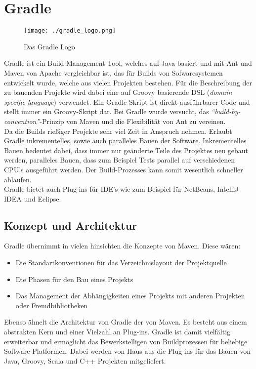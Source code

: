 \documentclass[a4paper]{article}
\begin{document}
\section{Gradle}
\begin{figure}[h]
	\begin{center}
		\texttt{[image: ./gradle\_logo.png]}
		\caption{Das Gradle Logo}
		\label{fig:gradle_logo}
	\end{center}
\end{figure}
Gradle ist ein Build-Management-Tool, welches auf Java basiert und mit Ant und Maven von Apache vergleichbar ist, das für Builds  von Sofwaresystemen entwickelt wurde, welche aus vielen Projekten bestehen. Für die Beschreibung der zu bauenden Projekte wird dabei eine auf Groovy basierende DSL (\textit{domain specific language}) verwendet. Ein Gradle-Skript ist direkt ausführbarer Code und stellt immer ein Groovy-Skript dar. Bei Gradle wurde versucht, das \textit{\textquotedblleft build-by-convention\textquotedblright}-Prinzip von Maven und die Flexibilität von Ant zu vereinen.
\\
Da die Builds rießiger Projekte sehr viel Zeit in Anspruch nehmen. Erlaubt Gradle inkrementelles, sowie auch paralleles Bauen der Software. Inkrementelles Bauen bedeutet dabei, dass immer nur geänderte Teile des Projektes neu gebaut werden, paralleles Bauen, dass zum Beispiel Tests parallel auf verschiedenen CPU's ausgeführt werden. Der Build-Prozesses kann somit wesentlich schneller ablaufen.
\\
Gradle bietet auch Plug-ins für IDE's wie zum Beispiel für NetBeans, IntelliJ IDEA und Eclipse.
\subsection{Konzept und Architektur}
Gradle übernimmt in vielen hinsichten die Konzepte von Maven. Diese wären:
\begin{itemize}
	\item Die Standartkonventionen für das Verzeichnislayout der Projektquelle
	\item Die Phasen für den Bau eines Projekts
	\item Das Management der Abhängigkeiten eines Projekts mit anderen Projekten oder Fremdbibliotheken
\end{itemize}
Ebenso ähnelt die Architektur von Gradle der von Maven. Es besteht aus einem abstrakten Kern und einer Vielzahl an Plug-ins. Gradle ist damit vielfältig erweiterbar und ermöglicht das Bewerkstelligen von Buildprozessen für beliebige Software-Platformen. Dabei werden von Haus aus die Plug-ins für das Bauen von Java, Groovy, Scala und C++ Projekten mitgeliefert.
\end{document}
